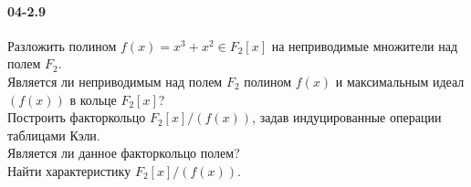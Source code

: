 \documentclass[12pt]{article}
\begin{document}
	\paragraph{04-2.9} Разложить полином $f(x) = x^3 + x^2 \in F_{2}[x]$ на неприводимые множители над полем $F_{2}$. \\
	Является ли неприводимым над полем $F_{2}$ полином $f(x)$ и максимальным идеал $(f(x))$ в кольце $F_{2}[x]$? \\
	Построить факторкольцо $F_{2}[x]/(f(x))$, задав индуцированные операции таблицами Кэли. \\
	Является ли данное факторкольцо полем? \\
	Найти характеристику $F_{2}[x]/(f(x))$.
	\\ \\
	\ensuremath{}
	\clearpage
\end{document}
